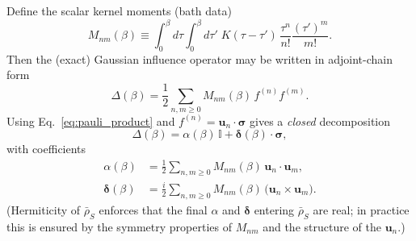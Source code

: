 Define the scalar kernel moments (bath data)
\begin{equation}
    M_{nm}(\beta)\equiv
    \int_0^\beta d\tau\int_0^\beta d\tau'\;
    K(\tau-\tau')\,\frac{\tau^n}{n!}\frac{(\tau')^m}{m!}.
    \label{eq:Mnm_def_qubit}
\end{equation}
Then the (exact) Gaussian influence operator may be written in adjoint-chain form
\begin{equation}
    \Delta(\beta)=\frac12\sum_{n,m\ge 0} M_{nm}(\beta)\, f^{(n)} f^{(m)}.
    \label{eq:Delta_adj_chain_qubit}
\end{equation}
Using Eq.~\eqref{eq:pauli_product} and $f^{(n)}=\mathbf u_n\cdot\boldsymbol\sigma$ gives a \emph{closed}
decomposition
\begin{equation}
    \Delta(\beta)=\alpha(\beta)\,\mathbb I + \boldsymbol\delta(\beta)\cdot\boldsymbol\sigma,
    \label{eq:Delta_bloch}
\end{equation}
with coefficients
\begin{align}
    \alpha(\beta)
    &=
    \frac12\sum_{n,m\ge 0} M_{nm}(\beta)\,\mathbf u_n\cdot\mathbf u_m,
    \label{eq:alpha_def}\\
    \boldsymbol\delta(\beta)
    &=
    \frac{i}{2}\sum_{n,m\ge 0} M_{nm}(\beta)\,\big(\mathbf u_n\times\mathbf u_m\big).
    \label{eq:delta_def}
\end{align}
(Hermiticity of $\bar\rho_S$ enforces that the final $\alpha$ and $\boldsymbol\delta$ entering $\bar\rho_S$
are real; in practice this is ensured by the symmetry properties of $M_{nm}$ and the structure of the $\mathbf u_n$.)


